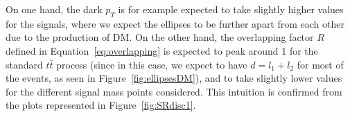 \documentclass[a4paper, 10pt, openright]{report}
\begin{document}
On one hand, the dark $p_T$ is for example expected to take slightly higher values for the signals, where we expect the ellipses to be further apart from each other due to the production of \ac{DM}. On the other hand, the overlapping factor $R$ defined in Equation~\ref{eq:overlapping} is expected to peak around 1 for the standard $t \bar t$ process (since in this case, we expect to have $d = l_1 + l_2$ for most of the events, as seen in Figure~\ref{fig:ellipsesDM}), and to take slightly lower values for the different signal mass points considered. This intuition is confirmed from the plots represented in Figure~\ref{fig:SRdisc1}.

\begin{figure}[htbp]
\centering
{}


\end{figure}
\end{document}
